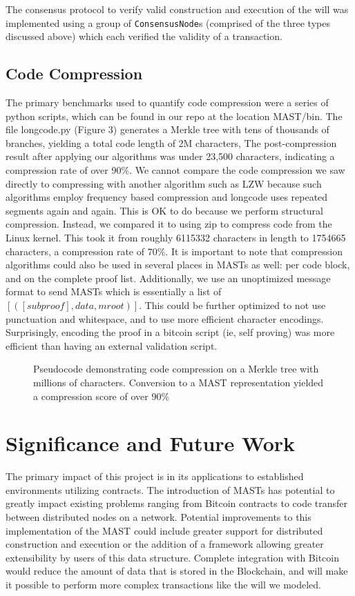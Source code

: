 \documentclass{vldb}
\begin{document}
The consensus protocol to verify valid construction and execution of the will
was implemented using a group of \texttt{ConsensusNode}s (comprised of the three types
discussed above) which each verified the validity of a transaction.

\subsection{Code Compression}

The primary benchmarks used to quantify code compression were a series of
python scripts, which can be found in our repo at the location MAST/bin. The
file longcode.py (Figure 3) generates a Merkle tree with tens of thousands of
branches, yielding a total code length of 2M characters, The post-compression
result after applying our algorithms was under 23,500 characters, indicating a
compression rate of over 90\%. We cannot compare the code compression we saw
directly to compressing with another algorithm such as LZW because such
algorithms employ frequency based compression and longcode uses repeated
segments again and again. This is OK to do because we perform structural
compression. Instead, we compared it to using zip to compress code from the Linux kernel.
This took it from roughly 6115332 characters in length to 1754665 characters, a
compression rate of 70\%. It is important to note that compression algorithms
could also be used in several places in MASTs as well: per code block, and on
the complete proof list. Additionally, we use an unoptimized message format to send
MASTs which is essentially a list of $[([subproof],data, mroot) ]$. This could be
further optimized to not use punctuation and whitespace, and to use more
efficient character encodings. Surprisingly, encoding the proof in a bitcoin
script (ie, self proving) was more efficient than having an external validation
script.

\begin{figure}[h]
	
	\caption{Pseudocode demonstrating code compression on a Merkle tree with millions of characters. Conversion to a MAST representation yielded a compression score of over 90\%}
           \label{code}
\end{figure}

\section{Significance and Future Work}

The primary impact of this project is in its applications to established
environments utilizing contracts. The introduction of MASTs has potential to
greatly impact existing problems ranging from Bitcoin contracts to code
transfer between distributed nodes on a network. Potential improvements to this
implementation of the MAST could include greater support for distributed
construction and execution or the addition of a framework allowing greater
extensibility by users of this data structure. Complete integration with
Bitcoin would reduce the amount of data that is stored in the Blockchain, and
will make it possible to perform more complex transactions like the will we
modeled.



\end{document}
